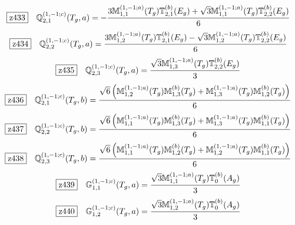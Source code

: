 \documentclass[fleqn,10pt,landscape]{jsarticle}
\begin{document}
\begin{dmath*}
\hspace*{3mm}\fbox{z433}\quad \mathbb{Q}_{2,1}^{(1,-1;c)}(T_{g},a)=- \frac{3 \mathbb{M}_{1,1}^{(1,-1;a)}(T_{g}) \mathbb{T}_{2,1}^{(b)}(E_{g}) + \sqrt{3} \mathbb{M}_{1,1}^{(1,-1;a)}(T_{g}) \mathbb{T}_{2,2}^{(b)}(E_{g})}{6}
\end{dmath*}
\begin{dmath*}
\hspace*{3mm}\fbox{z434}\quad \mathbb{Q}_{2,2}^{(1,-1;c)}(T_{g},a)=\frac{3 \mathbb{M}_{1,2}^{(1,-1;a)}(T_{g}) \mathbb{T}_{2,1}^{(b)}(E_{g}) - \sqrt{3} \mathbb{M}_{1,2}^{(1,-1;a)}(T_{g}) \mathbb{T}_{2,2}^{(b)}(E_{g})}{6}
\end{dmath*}
\begin{dmath*}
\hspace*{3mm}\fbox{z435}\quad \mathbb{Q}_{2,3}^{(1,-1;c)}(T_{g},a)=\frac{\sqrt{3} \mathbb{M}_{1,3}^{(1,-1;a)}(T_{g}) \mathbb{T}_{2,2}^{(b)}(E_{g})}{3}
\end{dmath*}
\begin{dmath*}
\hspace*{3mm}\fbox{z436}\quad \mathbb{Q}_{2,1}^{(1,-1;c)}(T_{g},b)=\frac{\sqrt{6} \left(\mathbb{M}_{1,2}^{(1,-1;a)}(T_{g}) \mathbb{M}_{1,3}^{(b)}(T_{g}) + \mathbb{M}_{1,3}^{(1,-1;a)}(T_{g}) \mathbb{M}_{1,2}^{(b)}(T_{g})\right)}{6}
\end{dmath*}
\begin{dmath*}
\hspace*{3mm}\fbox{z437}\quad \mathbb{Q}_{2,2}^{(1,-1;c)}(T_{g},b)=\frac{\sqrt{6} \left(\mathbb{M}_{1,1}^{(1,-1;a)}(T_{g}) \mathbb{M}_{1,3}^{(b)}(T_{g}) + \mathbb{M}_{1,3}^{(1,-1;a)}(T_{g}) \mathbb{M}_{1,1}^{(b)}(T_{g})\right)}{6}
\end{dmath*}
\begin{dmath*}
\hspace*{3mm}\fbox{z438}\quad \mathbb{Q}_{2,3}^{(1,-1;c)}(T_{g},b)=\frac{\sqrt{6} \left(\mathbb{M}_{1,1}^{(1,-1;a)}(T_{g}) \mathbb{M}_{1,2}^{(b)}(T_{g}) + \mathbb{M}_{1,2}^{(1,-1;a)}(T_{g}) \mathbb{M}_{1,1}^{(b)}(T_{g})\right)}{6}
\end{dmath*}
\begin{dmath*}
\hspace*{3mm}\fbox{z439}\quad \mathbb{G}_{1,1}^{(1,-1;c)}(T_{g},a)=\frac{\sqrt{3} \mathbb{M}_{1,1}^{(1,-1;a)}(T_{g}) \mathbb{T}_{0}^{(b)}(A_{g})}{3}
\end{dmath*}
\begin{dmath*}
\hspace*{3mm}\fbox{z440}\quad \mathbb{G}_{1,2}^{(1,-1;c)}(T_{g},a)=\frac{\sqrt{3} \mathbb{M}_{1,2}^{(1,-1;a)}(T_{g}) \mathbb{T}_{0}^{(b)}(A_{g})}{3}
\end{dmath*}
\end{document}
